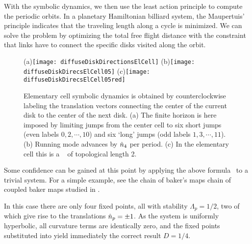 With the symbolic dynamics, we then use the least action principle to
compute the periodic orbits. In a planetary Hamiltonian
billiard system, the Maupertuis' principle indicates that the
traveling length along a cycle is minimized. We can solve the problem
by optimizing the total free flight distance with the constraint that
links have to connect the specific disks visited along the orbit.

\begin{figure}
  \begin{center}
    (a)\texttt{[image: diffuseDiskDirectionsElCell]}
    (b)\texttt{[image: diffuseDiskDirecsElCell05]}
    (c)\texttt{[image: diffuseDiskDirecsElCell05red]}
  \end{center}
  \caption{\label{fig-diskDirectionsElCell}
  Elementary cell symbolic dynamics is obtained by counterclockwise
  labeling the translation vectors connecting the center of the current
  disk to the center of  the next disk. (a) The finite horizon is here
  imposed by limiting jumps from  the center cell to six short jumps
  (even labels $0, 2,\cdots,10$) and six `long' jumps (odd labels $1,
  3,\cdots,11$). (b) Running mode   advances by $\hat{n}_4$ per
  period. (c) In the elementary cell this is  a \po\  of
  topological length 2.
  }
\end{figure}

Some confidence can be gained at this point by applying the above
formula~ to a trivial system. For a simple example, 
see the chain of baker's maps chain of coupled baker maps studied in 
.

In this case there are only four fixed points, all with stability
$\Lambda_p=1/2$, two of which give rise to the translations
$\hat{n}_{p}=\pm 1$. As the system is uniformly hyperbolic, all curvature
terms are identically zero, and the fixed points substituted into
 yield immediately the correct result $D=1/4$.
